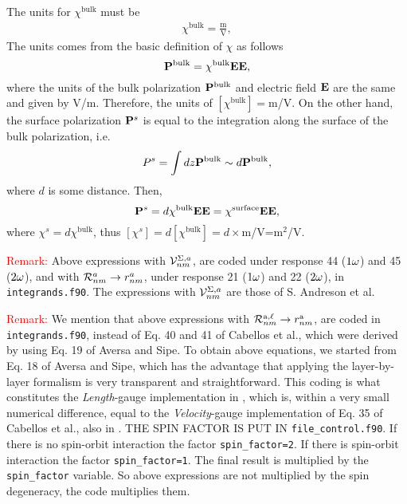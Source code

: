 The units  for $\chi^{\text{bulk}}$ must be
\begin{align}\label{units.2}
\chi^{\text{bulk}}=\frac{\text{m}}{\text{V}} 
,
\end{align} 
The units comes from the basic definition of $\chi$ as follows
\begin{equation}\label{u.1}
\mathbf{P}^{\text{bulk}}=\chi^{\text{bulk}}\mathbf{E}\mathbf{E}
,
\end{equation}
where the units of the bulk polarization $\mathbf{P}^{\text{bulk}}$
 and electric field $\mathbf{E}$
are the same and given by V/m. Therefore, the units of 
$[\chi^{\text{bulk}}]=$m/V.
On the other hand,
the surface polarization $\mathbf{P}^s$ is equal to the integration along the surface of      
the bulk polarization, i.e.                                                      
\begin{equation}\label{u.2} 
P^s=\int dz \mathbf{P}^{\text{bulk}}\sim d \mathbf{P}^{\text{bulk}}                                             
,
\end{equation} 
where $d$ is some distance. Then,                                                  
\begin{equation}\label{u.3}
\mathbf{P}^s=d \chi^{\text{bulk}}\mathbf{E}\mathbf{E}                                             
=\chi^{\text{surface}}\mathbf{E}\mathbf{E}                                             
,
\end{equation}
where $\chi^s=d\chi^{\text{bulk}}$,
thus
$[\chi^s]=d[\chi^{\text{bulk}}]=d\times$m/V=m$^2$/V.                                                             

\textcolor{red}{Remark:}  
Above expressions with ${\cal V}^{\Sigma,a}_{nm}$,
are coded under response 44 ($1\omega$) and 45 ($2\omega$), and with
${\cal R}^{a}_{nm}\to r^a_{nm}$,
under response 21 ($1\omega$) and 22 ($2\omega$), in 
\verb=integrands.f90=. 
The expressions with ${\cal V}^{\Sigma,a}_{nm}$ are those of 
S. Andreson et al.\cite{andersonPRB15} 

\textcolor{red}{Remark:} We mention that above expressions with 
${\cal R}^{\mathrm{a},\ell}_{nm}\to r^{\mathrm{a}}_{nm}$, are coded in
\verb=integrands.f90=, instead of Eq. 40 and 41 of Cabellos et
al.\cite{cabellosPRB09}, which were derived by using Eq. 19 of Aversa
and Sipe.\cite{aversaPRB95} To obtain above equations, we started
from Eq. 18 of Aversa and Sipe,\cite{aversaPRB95} which has the
advantage that applying the layer-by-layer formalism is very
transparent and straightforward. This coding is what constitutes the
{\it Length}-gauge implementation in \tiniba, which is, within a very
small numerical difference, equal to the {\it Velocity}-gauge
implementation of Eq. 35 of Cabellos et al.\cite{cabellosPRB09}, also
in \tiniba. 
{\color{red} THE SPIN FACTOR IS PUT IN
}\verb=file_control.f90=. 
If there is no spin-orbit interaction the 
factor \Verb+spin_factor=2+.  
If there is spin-orbit interaction the 
factor \Verb+spin_factor=1+. The final result is multiplied by  
the \verb=spin_factor= variable. So above expressions are not
multiplied by the spin degeneracy, the code multiplies them.   
